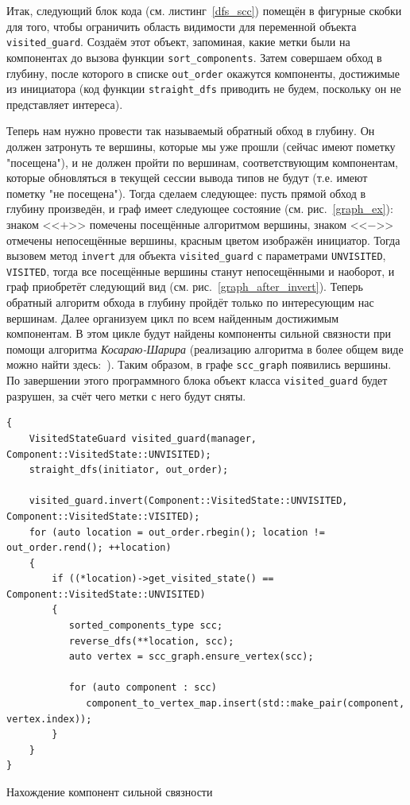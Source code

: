 Итак, следующий блок кода (см. листинг~\ref{dfs_scc}) помещён в фигурные скобки для того, чтобы ограничить область видимости для переменной объекта  \lstinline!visited_guard!. Создаём этот объект, запоминая, какие метки были на компонентах до вызова функции \lstinline!sort_components!. Затем совершаем обход в глубину, после которого в списке \lstinline!out_order! окажутся компоненты, достижимые из инициатора (код функции \lstinline!straight_dfs! приводить не будем, поскольку он не представляет интереса). 

Теперь нам нужно провести так называемый обратный обход в глубину. Он должен затронуть те вершины, которые мы уже прошли (сейчас имеют пометку "посещена"), и не должен пройти по вершинам, соответствующим компонентам, которые обновляться в текущей сессии вывода типов не будут (т.е. имеют пометку "не посещена"). Тогда сделаем следующее: пусть прямой обход в глубину произведён, и граф имеет следующее состояние (см. рис.~\ref{graph_ex}): знаком <<$+$>> помечены посещённые алгоритмом вершины, знаком <<$-$>> отмечены непосещённые вершины, красным цветом изображён инициатор. Тогда вызовем метод \lstinline!invert! для объекта \lstinline!visited_guard! с параметрами \lstinline!UNVISITED!, \lstinline!VISITED!, тогда все посещённые вершины станут непосещёнными и наоборот, и граф приобретёт следующий вид (см. рис.~\ref{graph_after_invert}). Теперь обратный алгоритм обхода в глубину пройдёт только по интересующим нас вершинам. Далее организуем цикл по всем найденным достижимым компонентам. В этом цикле будут найдены компоненты сильной связности при помощи алгоритма \textit{Косараю-Шарира} (реализацию алгоритма в более общем виде можно найти здесь:~\autocite{emax_topo}). Таким образом, в графе \lstinline!scc_graph! появились вершины. По завершении этого программного блока объект класса \lstinline!visited_guard! будет разрушен, за счёт чего метки с него будут сняты.

\begin{ListingEnv}
	\begin{lstlisting}
{
    VisitedStateGuard visited_guard(manager, Component::VisitedState::UNVISITED);
    straight_dfs(initiator, out_order);

    visited_guard.invert(Component::VisitedState::UNVISITED, Component::VisitedState::VISITED);
    for (auto location = out_order.rbegin(); location != out_order.rend(); ++location)
    {
        if ((*location)->get_visited_state() == Component::VisitedState::UNVISITED)
        {
           sorted_components_type scc;
           reverse_dfs(**location, scc);
           auto vertex = scc_graph.ensure_vertex(scc);
           
           for (auto component : scc)
              component_to_vertex_map.insert(std::make_pair(component, vertex.index));
        }
    }
}
	\end{lstlisting}
	\caption{Нахождение компонент сильной связности}\label{dfs_scc}
\end{ListingEnv}

